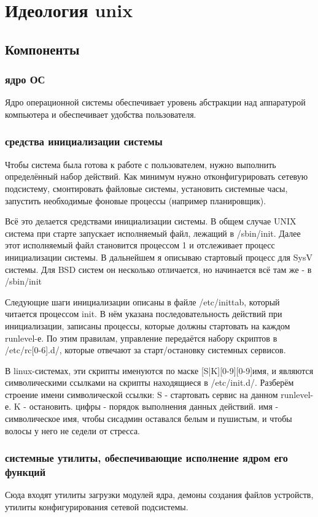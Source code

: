 \chapter {Идеология unix}
\section {Компоненты}
\subsection{ядро ОС}
Ядро операционной системы обеспечивает уровень абстракции над аппаратурой компьютера и обеспечивает удобства пользователя.
\subsection{средства инициализации системы}
Чтобы система была готова к работе с пользователем, нужно выполнить определённый набор действий.
Как минимум нужно отконфигурировать сетевую подсистему, смонтировать файловые системы, установить системные часы, запустить необходимые фоновые процессы (например планировщик).
\par
Всё это делается средствами инициализации системы. В общем случае UNIX система при старте запускает исполняемый файл, лежащий в /sbin/init. Далее этот исполняемый файл становится процессом 1 и отслеживает процесс инициализации системы. В дальнейшем я описываю стартовый процесс для SysV системы. Для BSD систем он несколько отличается, но начинается всё там же - в /sbin/init
\par
Следующие шаги инициализации описаны в файле /etc/inittab, который читается процессом init. В нём указана последовательность действий при инициализации, записаны процессы, которые должны стартовать на каждом runlevel-е. По этим правилам, управление передаётся набору скриптов в /etc/rc[0-6].d/, которые отвечают за старт/остановку системных сервисов.
\par
В linux-системах, эти скрипты именуются по маске [S|K][0-9][0-9]имя, и являются символическими ссылками на скрипты находящиеся в /etc/init.d/. Разберём строение имени символической ссылки: S - стартовать сервис на данном runlevel-е.
K - остановить.
цифры - порядок выполнения данных действий.
имя - символическое имя, чтобы сисадмин оставался белым и пушистым, и чтобы волосы у него не седели от стресса.
\subsection{системные утилиты, обеспечивающие исполнение ядром его функций}
Сюда входят утилиты загрузки модулей ядра, демоны создания файлов устройств, утилиты конфигурирования сетевой подсистемы.
